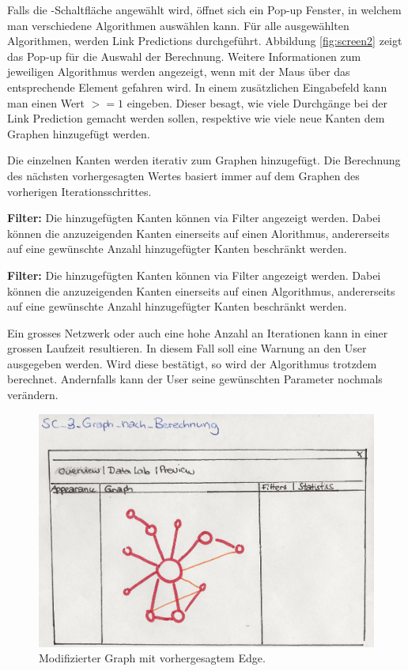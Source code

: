 Falls die -Schaltfläche angewählt wird, öffnet sich ein Pop-up Fenster, in welchem man verschiedene Algorithmen auswählen
kann. Für alle ausgewählten Algorithmen, werden Link Predictions durchgeführt.
Abbildung \ref{fig:screen2} zeigt das Pop-up für die Auswahl der Berechnung.
Weitere Informationen zum jeweiligen Algorithmus werden angezeigt, wenn mit der Maus über das entsprechende Element gefahren wird.
In einem zusätzlichen Eingabefeld kann man einen Wert $>= 1$ eingeben.
Dieser besagt, wie viele Durchgänge bei der Link Prediction gemacht werden sollen, respektive wie viele neue Kanten dem Graphen hinzugefügt werden.

Die einzelnen Kanten werden iterativ zum Graphen hinzugefügt. Die Berechnung des nächsten vorhergesagten Wertes basiert immer auf dem Graphen des vorherigen Iterationsschrittes.

\item \textbf{Filter:} Die hinzugefügten Kanten können via Filter angezeigt werden.
Dabei können die anzuzeigenden Kanten einerseits auf einen Alorithmus, andererseits auf eine gewünschte Anzahl hinzugefügter Kanten beschränkt werden.
\item \textbf{Filter:} Die hinzugefügten Kanten können via Filter angezeigt werden. Dabei können die anzuzeigenden Kanten einerseits auf einen Algorithmus, andererseits auf eine gewünschte Anzahl hinzugefügter Kanten beschränkt werden.


Ein grosses Netzwerk oder auch eine hohe Anzahl an Iterationen kann in einer grossen Laufzeit resultieren.
In diesem Fall soll eine Warnung an den User ausgegeben werden. Wird diese bestätigt, so wird der Algorithmus trotzdem berechnet. Andernfalls kann der User seine gewünschten
Parameter nochmals verändern.

\begin{figure}
    \includegraphics[width=\linewidth]{resources/SC-3.png}
    \caption{Modifizierter Graph mit vorhergesagtem Edge.}
    \label{fig:screen3}
\end{figure}

